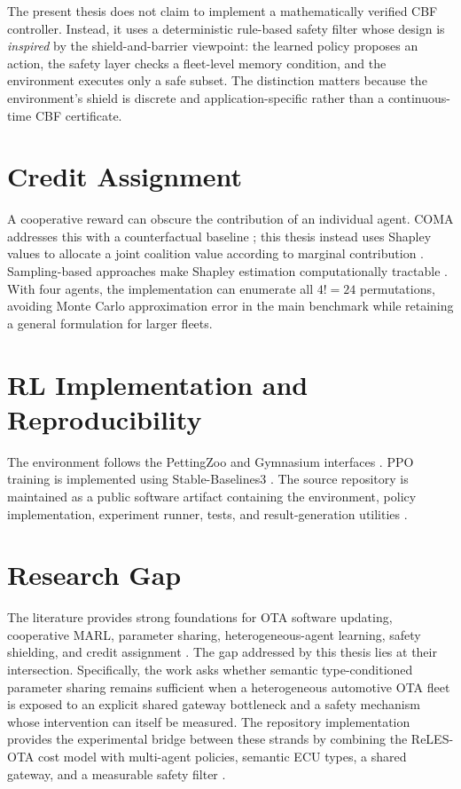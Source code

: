 \documentclass{iutbscthesis}
\begin{document}
The present thesis does not claim to implement a mathematically verified CBF controller. Instead, it uses a deterministic rule-based safety filter whose design is \emph{inspired} by the shield-and-barrier viewpoint: the learned policy proposes an action, the safety layer checks a fleet-level memory condition, and the environment executes only a safe subset. The distinction matters because the environment's shield is discrete and application-specific rather than a continuous-time CBF certificate.

\section{Credit Assignment}
A cooperative reward can obscure the contribution of an individual agent. COMA addresses this with a counterfactual baseline \parencite{foerster2018coma}; this thesis instead uses Shapley values to allocate a joint coalition value according to marginal contribution \parencite{shapley1953value}. Sampling-based approaches make Shapley estimation computationally tractable \parencite{castro2009shapley}. With four agents, the implementation can enumerate all $4!=24$ permutations, avoiding Monte Carlo approximation error in the main benchmark while retaining a general formulation for larger fleets.

\section{RL Implementation and Reproducibility}
The environment follows the PettingZoo and Gymnasium interfaces \parencite{terry2021pettingzoo,towers2024gymnasium}. PPO training is implemented using Stable-Baselines3 \parencite{raffin2021sb3}. The source repository is maintained as a public software artifact containing the environment, policy implementation, experiment runner, tests, and result-generation utilities \parencite{ma_reles_ota_repo}.

\section{Research Gap}
The literature provides strong foundations for OTA software updating, cooperative MARL, parameter sharing, heterogeneous-agent learning, safety shielding, and credit assignment \parencite{halder2020survey,ghosal2022stride,yu2022surprising,terry2020revisiting,alshiekh2018shielding}. The gap addressed by this thesis lies at their intersection. Specifically, the work asks whether semantic type-conditioned parameter sharing remains sufficient when a heterogeneous automotive OTA fleet is exposed to an explicit shared gateway bottleneck and a safety mechanism whose intervention can itself be measured. The repository implementation provides the experimental bridge between these strands by combining the ReLES-OTA cost model with multi-agent policies, semantic ECU types, a shared gateway, and a measurable safety filter \parencite{bhattacharjee2025relesota,ma_reles_ota_repo}.
\end{document}
